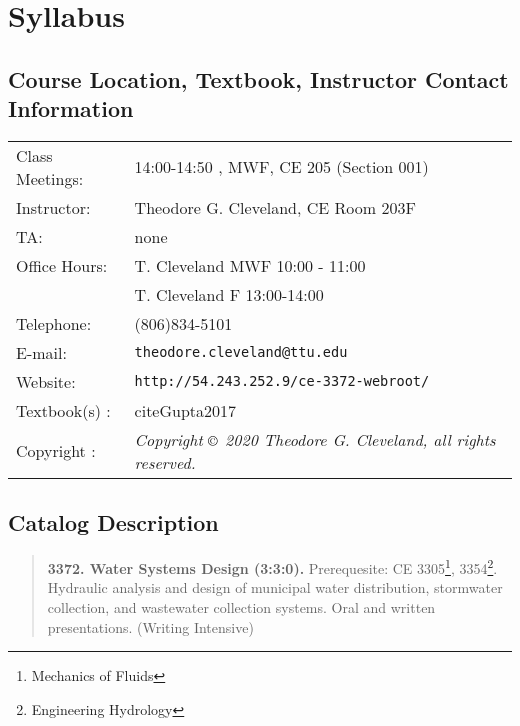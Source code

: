 \documentclass[12pt]{article}
\begin{document}
\section*{Syllabus}

\subsection*{{Course Location, Textbook, Instructor Contact Information}}
\begin{tabular}{p{1.5in}p{5.0in}}
Class Meetings:  &    14:00-14:50 , MWF, CE 205 (Section 001) \\
Instructor: & Theodore G. Cleveland, CE Room 203F \\
TA: & none \\
Office Hours:  & T. Cleveland MWF 10:00 - 11:00 \\
~ & T. Cleveland F 13:00-14:00\\
Telephone: & (806)834-5101 \\
E-mail: & \texttt{theodore.cleveland@ttu.edu}\\
Website: & \texttt{http://54.243.252.9/ce-3372-webroot/} \\
Textbook(s) : &  cite{Gupta2017} \\ 
Copyright : & \textsl{Copyright $\copyright$ 2020 Theodore G. Cleveland, all rights reserved.} \\
\end{tabular}
\subsection*{{Catalog Description}}
\begin{quote} \textbf{3372. Water Systems Design (3:3:0).}  Prerequesite: CE 3305\footnote{Mechanics of Fluids}, 3354\footnote{Engineering Hydrology}.  Hydraulic analysis and design of municipal water distribution, stormwater collection, and wastewater collection systems.  Oral and written presentations. (Writing Intensive)
\end{quote}
\end{document}
